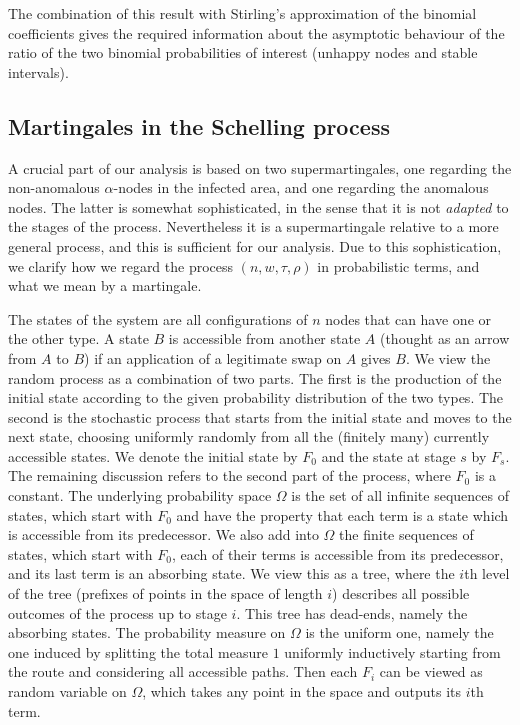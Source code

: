 \documentclass[11pt]{article}
\theoremstyle{plain}
\numberwithin{equation}{subsection}
\begin{document}
The combination of this result with Stirling's approximation of the binomial
coefficients gives the required information about the 
asymptotic behaviour of the ratio of the two binomial probabilities
of interest (unhappy nodes and stable intervals).

\subsection{Martingales in the Schelling process}
A crucial part of our analysis is based on two supermartingales, one regarding the 
non-anomalous $\alpha$-nodes in the infected area, and one regarding the anomalous nodes.
The latter is somewhat sophisticated, in  the sense that it is not {\em adapted} to the stages of the process.
Nevertheless it is a supermartingale relative to a more general process, and this is sufficient for our analysis.
Due to this sophistication, we clarify how we regard the process $(n,w,\tau,\rho)$ in probabilistic terms,
and what we mean by a martingale.

The states of the system are all configurations of $n$ nodes that can have one or the other type.
A state $B$ is accessible from another state $A$ (thought as an arrow from $A$ to $B$) if an application of a legitimate swap on
$A$ gives $B$.
We view the random process as a combination of two parts. The first is the production of the initial state according to the given probability
distribution of the two types. The second is the stochastic process that starts from the initial state and  moves to the next
state, choosing uniformly randomly from all  the (finitely many) currently accessible states.
We denote the initial state by $F_0$ and the state at stage $s$ by $F_s$. 
The remaining discussion refers to the second part of the process, where $F_0$ is a constant.
The underlying probability space $\Omega$ is the
set of all infinite sequences of states, which start with $F_0$ and have the property that each term is a 
state which is accessible from its predecessor. We also add into $\Omega$ the finite sequences of states,
which start with $F_0$, each of their terms is accessible from its predecessor, and its last term is an absorbing state.
We view this as a tree, where the $i$th level of the tree
(prefixes of points in the space of length $i$) describes all possible outcomes of the process up to stage $i$.
This tree has dead-ends, namely the
absorbing states. The probability measure on $\Omega$ is the uniform one, namely the one induced by splitting the total measure
$1$ uniformly inductively starting from the route and considering all accessible paths.
Then each $F_i$ can be viewed as random variable on $\Omega$,  which takes any point in the space and outputs its $i$th term.
\end{document}
